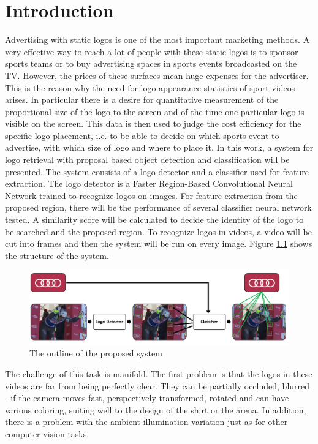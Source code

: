 \chapter{Introduction}\label{c:intro}

Advertising with static logos is one of the most important marketing methods. A very effective way to reach a lot of people with these static logos is to sponsor sports teams or to buy advertising spaces in sports events broadcasted on the TV. However, the prices of these surfaces mean huge expenses for the advertiser. This is the reason why the need for logo appearance statistics of sport videos arises. In particular there is a desire for quantitative measurement of the proportional size of the logo to the screen and of the time one particular logo is visible on the screen. This data is then used to judge the cost efficiency for the specific logo placement, i.e. to be able to decide on which sports event to advertise, with which size of logo and where to place it.
\bigbreak
In this work, a system for logo retrieval with proposal based object detection and classification will be presented. The system consists of a logo detector and a classifier used for feature extraction. The logo detector is a Faster Region-Based Convolutional Neural Network \cite{NIPS2015_5638} trained to recognize logos on images. For feature extraction from the proposed region, there will be the performance of several classifier neural network tested. A similarity score will be calculated to decide the identity of the logo to be searched and the proposed region. To recognize logos in videos, a video will be cut into frames and then the system will be run on every image. Figure \ref{f:outline} shows the structure of the system.
\begin{figure}[h!]
	\centering
	\includegraphics[width=12cm]{images/mt/outline.png}
	\caption{The outline of the proposed system}
	\label{f:outline}
\end{figure}
The challenge of this task is manifold. The first problem is that the logos in these videos are far from being perfectly clear. They can be partially occluded, blurred - if the camera moves fast, perspectively transformed, rotated and can have various coloring, suiting well to the design of the shirt or the arena. In addition, there is a problem with the ambient illumination variation just as for other computer vision tasks.

